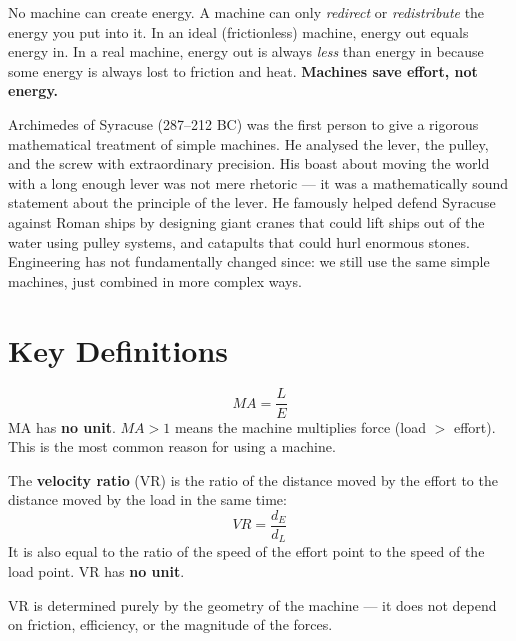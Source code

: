\begin{keybox}
No machine can create energy. A machine can only
\textit{redirect} or \textit{redistribute} the energy
you put into it. In an ideal (frictionless) machine,
energy out equals energy in. In a real machine,
energy out is always \textit{less} than energy in
because some energy is always lost to friction and
heat. \textbf{Machines save effort, not energy.}
\end{keybox}

\begin{historybox}
Archimedes of Syracuse (287--212 BC) was the first
person to give a rigorous mathematical treatment of
simple machines. He analysed the lever, the pulley,
and the screw with extraordinary precision. His
boast about moving the world with a long enough
lever was not mere rhetoric --- it was a mathematically
sound statement about the principle of the lever.
He famously helped defend Syracuse against Roman
ships by designing giant cranes that could lift
ships out of the water using pulley systems, and
catapults that could hurl enormous stones. Engineering
has not fundamentally changed since: we still use
the same simple machines, just combined in more
complex ways.
\end{historybox}

\section{Key Definitions}

\begin{definitionbox}


\[
  MA = \frac{L}{E}
\]
MA has \textbf{no unit}. $MA > 1$ means the machine
multiplies force (load $>$ effort). This is the most
common reason for using a machine.
\end{definitionbox}

\begin{definitionbox}
The \textbf{velocity ratio} (VR) is the ratio of the
distance moved by the effort to the distance moved
by the load in the same time:
\[
  VR = \frac{d_E}{d_L}
\]
It is also equal to the ratio of the speed of the
effort point to the speed of the load point.
VR has \textbf{no unit}.

VR is determined purely by the geometry of the
machine --- it does not depend on friction, efficiency,
or the magnitude of the forces.
\end{definitionbox}

